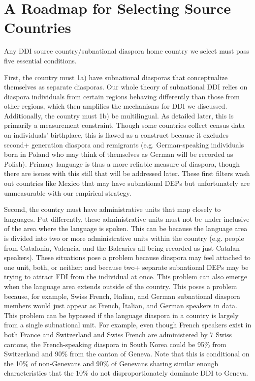\documentclass[doublespace,nopageskip]{UVAthesis}
\begin{document}
        \section{A Roadmap for Selecting Source Countries} \label{ss:source_country_roadmap}
Any DDI source country/subnational diaspora home country we select must pass five essential conditions. 

    First, the country must 1a) have subnational diasporas that conceptualize themselves as separate diasporas. Our whole theory of subnational DDI relies on diaspora individuals from certain regions behaving differently than those from other regions, which then amplifies the mechanisms for DDI we discussed. Additionally, the country must 1b) be multilingual. As detailed later, this is primarily a measurement constraint. Though some countries collect census data on individuals' birthplace, this is flawed as a construct because it excludes second+ generation  diaspora and remigrants (e.g. German-speaking individuals born in Poland who may think of themselves as German will be recorded as Polish). Primary language is thus a more reliable measure of diaspora, though there are issues with this still that will be addressed later. These first filters wash out countries like Mexico that may have subnational DEPs but unfortunately are unmeasurable with our empirical strategy.

    Second, the country must have administrative units that map closely to languages. Put differently, these administrative units must not be under-inclusive of the area where the language is spoken. This can be because the language area is divided into two or more administrative units within the country (e.g. people from Catalonia, Valencia, and the Balearics all being recorded as just Catalan speakers). These situations pose a problem because diaspora may feel attached to one unit, both, or neither; and because two+ separate subnational DEPs may be trying to attract FDI from the individual at once. This problem can also emerge when the language area extends outside of the country. This poses a problem because, for example, Swiss French, Italian, and German subnational diaspora members would just appear as French, Italian, and German speakers in data. This problem can be bypassed if the language diaspora in a country is  largely from a single subnational unit. For example, even though French speakers exist in both France and Switzerland and Swiss French are administered by 7 Swiss cantons, the French-speaking diaspora in South Korea could be 95\% from Switzerland and 90\% from the canton of Geneva. Note that this is conditional on the 10\%  of non-Genevans and 90\% of Genevans sharing similar enough characteristics that the 10\% do not disproportionately dominate DDI to Geneva.
\end{document}

